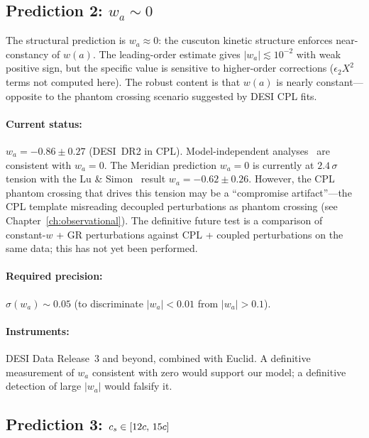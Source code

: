 \subsection{Prediction 2: \texorpdfstring{$w_a \sim 0$}{wa ~ 0}}
\label{sec:1-pred2}

The structural prediction is $w_a \approx 0$: the cuscuton kinetic structure enforces near-constancy of $w(a)$. The leading-order estimate gives $|w_a| \lesssim 10^{-2}$ with weak positive sign, but the specific value is sensitive to higher-order corrections ($\epsilon_2 X^2$ terms not computed here). The robust content is that $w(a)$ is nearly constant---opposite to the phantom crossing scenario suggested by DESI CPL fits.

\paragraph{Current status:} $w_a = -0.86 \pm 0.27$ (DESI~DR2 in CPL). Model-independent analyses~\cite{ch1:hasan25,ch1:mandal25} are consistent with $w_a = 0$. The Meridian prediction $w_a = 0$ is currently at $2.4\,\sigma$ tension with the Lu \& Simon~\cite{ch1:lu-simon} result $w_a = -0.62 \pm 0.26$. However, the CPL phantom crossing that drives this tension may be a ``compromise artifact''---the CPL template misreading decoupled perturbations as phantom crossing (see Chapter~\ref{ch:observational}). The definitive future test is a comparison of constant-$w$ + GR perturbations against CPL + coupled perturbations on the same data; this has not yet been performed.

\paragraph{Required precision:} $\sigma(w_a) \sim 0.05$ (to discriminate $|w_a| < 0.01$ from $|w_a| > 0.1$).

\paragraph{Instruments:} DESI Data Release~3 and beyond, combined with Euclid. A definitive measurement of $w_a$ consistent with zero would support our model; a definitive detection of large $|w_a|$ would falsify it.

\subsection{Prediction 3: \texorpdfstring{$c_s \in [12c,\, 15c]$}{cs in [12c, 15c]}}
\label{sec:1-pred3}

